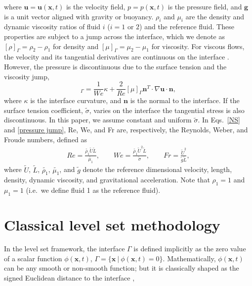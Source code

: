 \noindent where ${\bm u}={\bm u}({\bm x},t)$ is the velocity field, $p=p({\bm x},t)$ is the pressure field, and $\bm{g}$ is a unit vector aligned with gravity or buoyancy. $\rho_i$ and $\mu_i$ are the density and dynamic viscosity ratios of fluid $i$ ($i=1$ or $2$) and the reference fluid. These properties are  subject to a jump across the interface, which we denote as $[\rho]_\Gamma=\rho_2-\rho_1$ for density and $[\mu]_\Gamma=\mu_2-\mu_1$ for viscosity. For viscous flows, the velocity and its tangential derivatives are continuous on the interface \cite{Liu_JCP_1994}. However, the pressure is discontinuous due to the surface tension and the viscosity jump, \ie
\begin{equation}
    [p]_\Gamma = \frac{1}{We} \kappa + \frac{2}{Re}[\mu]_\Gamma {\bm n}^T \cdot \nabla {\bm u} \cdot {\bm n},
  \label{pressure jump}
\end{equation}
\noindent where $\kappa$ is the interface curvature, and ${\bm n}$ is the normal to the interface.  
If the surface tension coefficient, $\tilde{\sigma}$, varies on the interface the tangential stress is also discontinuous. In this paper, we assume constant and uniform $\tilde{\sigma}$. In Eqs.\ \eqref{NS} and \eqref{pressure jump}, Re, We, and Fr are, respectively, the Reynolds, Weber, and Froude numbers, defined as
\begin{equation}
  \begin{aligned}
    Re = \frac{\tilde{\rho_1} \tilde{U} \tilde{L}}{\tilde{\mu_1}},\quad \quad We = \frac{\tilde{\rho_1} \tilde{U}^2 \tilde{L}}{\tilde{\sigma}},\quad \quad Fr=\frac{\tilde{U}^2}{\tilde{g}\tilde{L}},      
  \label{non-di}    
  \end{aligned}
\end{equation}
\noindent where $\tilde{U}$, $\tilde{L}$, $\tilde{\rho_1}$, $\tilde{\mu_1}$, and $\tilde{g}$ denote the reference dimensional velocity, length, density, dynamic viscosity, and gravitational acceleration. Note that $\rho_1=1$ and $\mu_1=1$ (i.e.\ we define fluid 1 as the reference fluid).




\section{Classical level set methodology}
\label{subsec: dls}

In the level set framework, the interface $\Gamma$ is defined implicitly as the zero value of a scalar function $\phi({\bm x},t)$, \ie $\Gamma = \{ {\bm x} ~ \rvert ~ \phi({\bm x},t) = 0 \}$. Mathematically, $\phi({\bm x},t)$ can be any smooth or non-smooth function; but it is classically shaped as the signed Euclidean distance to the interface \cite{Mulder_JCP_1992, Sussman_JCP_1994}, \viz


